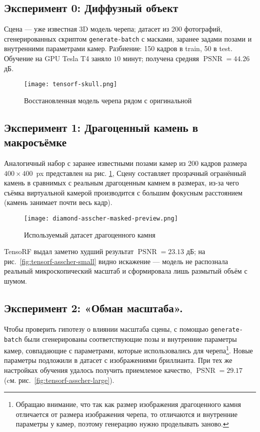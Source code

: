 \subsection{Эксперимент 0: Диффузный объект}
Сцена — уже известная 3D модель черепа; датасет из 200 фотографий, сгенерированных скриптом
\texttt{generate-batch} с масками, заранее задами позами и внутренними
параметрами камер. Разбиение: 150 кадров в train, 50 в test.  Обучение на GPU
Tesla T4 заняло $10$ минут; получена средняя $\operatorname{PSNR} = 44.26$ дБ.

\begin{figure}[h]
  \centering
  \texttt{[image: tensorf-skull.png]}
  \caption{Восстановленная модель черепа рядом с оригинальной}
\end{figure}

\subsection{Эксперимент 1: Драгоценный камень в макросъёмке}
Аналогичный набор с заранее известными позами камер из 200 кадров размера
$400\times400$~px представлен на рис.  \ref{fig:asscher-preview}, Сцену
составляет прозрачный огранённый камень в сравнимых с реальным драгоценным
камнем в размерах, из-за чего съёмка виртуальной камерой производится с большим
фокусным расстоянием (камень занимает почти весь кадр).

\begin{figure}[h]
  \centering
  \texttt{[image: diamond-asscher-masked-preview.png]}
  \caption{Используемый датасет драгоценного камня}
	\label{fig:asscher-preview}
\end{figure}

TensoRF выдал заметно худший результат $\operatorname{PSNR}=23.13$ дБ; на
рис.~\ref{fig:tensorf-asscher-small} видно искажение — модель не распознала
реальный микроскопический масштаб и сформировала лишь размытый объём с шумом.

\subsection{Эксперимент 2: «Обман масштаба».}
Чтобы проверить гипотезу о влиянии масштаба сцены, с помощью
\texttt{generate-batch} были сгенерированы соответствующие позы и внутренние
параметры камер, совпадающие с параметрами, которые использовались для
черепа\footnote{Обращаю внимание, что так как размер изображения драгоценного
камня отличается от размера изображения черепа, то отличаются и внутренние
параметры у камер, поэтому генерацию нужно проделывать заново.}.
Новые параметры подложили в датасет с изображениями бриллианта.
При тех же настройках обучения удалось получить приемлемое качество, $\operatorname{PSNR}=29.17$
(cм. рис.~\ref{fig:tensorf-asscher-large}).


